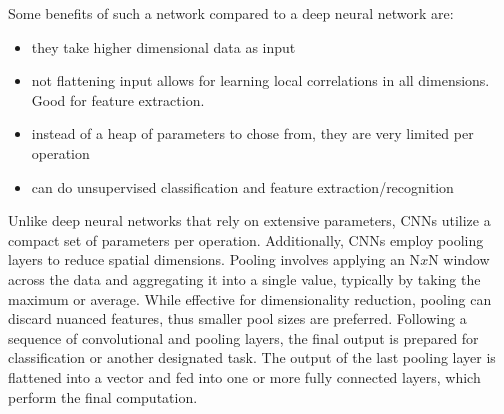 Some benefits of such a network compared to a deep neural network are:
\begin{itemize}
 \item they take higher dimensional data as input
 \item not flattening input allows for learning local correlations in all dimensions. Good for feature extraction.
 \item instead of a heap of parameters to chose from, they are very limited per operation
 \item can do unsupervised classification and feature extraction/recognition
\end{itemize}



Unlike deep neural networks that rely on extensive parameters, CNNs utilize a compact set of parameters per operation. Additionally, CNNs employ pooling layers to reduce spatial dimensions. Pooling involves applying an N$x$N window across the data and aggregating it into a single value, typically by taking the maximum or average. While effective for dimensionality reduction, pooling can discard nuanced features, thus smaller pool sizes are preferred. Following a sequence of convolutional and pooling layers, the final output is prepared for classification or another designated task. The output of the last pooling layer is flattened into a vector and fed into one or more fully connected layers, which perform the final computation.



